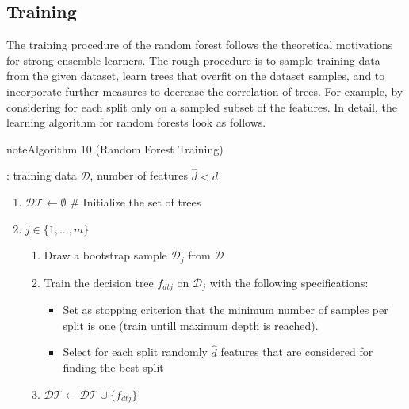 \documentclass[letterpaper,10pt,english]{jupyterBook}
\begin{document}
\subsection{Training}
\label{\detokenize{classification_random_forests:training}}
\sphinxAtStartPar
The training procedure of the random forest follows the theoretical motivations for strong ensemble learners. The rough procedure is to sample training data from the given dataset, learn trees that overfit on the dataset samples, and to incorporate further measures to decrease the correlation of trees. For example, by considering for each split only on a sampled subset of the features.
In detail, the learning algorithm for random forests look as follows.
\label{classification_random_forests:algorithm-2}
\begin{sphinxadmonition}{note}{Algorithm 10 (Random Forest Training)}



\sphinxAtStartPar
{}: training data \(\mathcal{D}\), number of features \(\hat{d}<d\)
\begin{enumerate}
%
\item {} 
\sphinxAtStartPar
\(\mathcal{DT}\gets\emptyset\) \# Initialize the set of trees

\item {} 
\sphinxAtStartPar
{} \(j\in\{1,\ldots, m\}\)
\begin{enumerate}
%
\item {} 
\sphinxAtStartPar
Draw a bootstrap sample \(\mathcal{D}_j\) from \(\mathcal{D}\)

\item {} 
\sphinxAtStartPar
Train the decision tree \(f_{dtj}\) on \(\mathcal{D}_j\) with the following specifications:
\begin{itemize}
\item {} 
\sphinxAtStartPar
Set as stopping criterion that the minimum number of samples per split is one (train untill maximum depth is reached).

\item {} 
\sphinxAtStartPar
Select for each split randomly \(\hat{d}\) features that are considered for finding the best split

\end{itemize}

\item {} 
\sphinxAtStartPar
\(\mathcal{DT}\gets \mathcal{DT}\cup\{f_{dtj}\}\)

\end{enumerate}

\end{enumerate}
\end{sphinxadmonition}
\end{document}
